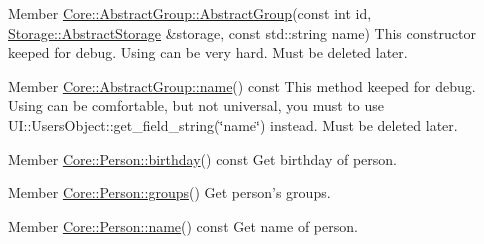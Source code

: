 \label{da/d58/deprecated__deprecated000001}
\hypertarget{da/d58/deprecated__deprecated000001}{}
 
\begin{DoxyDescription}
\item[Member \hyperlink{classCore_1_1AbstractGroup_a2b6c9e7b2d618019fe626d28a53ddd06}{Core::AbstractGroup::AbstractGroup}(const int id, \hyperlink{classStorage_1_1AbstractStorage}{Storage::AbstractStorage} \&storage, const std::string name) ]This constructor keeped for debug. Using can be very hard. Must be deleted later.
\end{DoxyDescription}

\label{da/d58/deprecated__deprecated000002}
\hypertarget{da/d58/deprecated__deprecated000002}{}
 
\begin{DoxyDescription}
\item[Member \hyperlink{classCore_1_1AbstractGroup_a139cc0a6451f2dbca1f74d96f28741f0}{Core::AbstractGroup::name}() const  ]This method keeped for debug. Using can be comfortable, but not universal, you must to use UI::UsersObject::get\_\-field\_\-string(\char`\"{}name\char`\"{}) instead. Must be deleted later.
\end{DoxyDescription}

\label{da/d58/deprecated__deprecated000007}
\hypertarget{da/d58/deprecated__deprecated000007}{}
 
\begin{DoxyDescription}
\item[Member \hyperlink{classCore_1_1Person_ab0d1836a97254798585fc6c97a63680e}{Core::Person::birthday}() const  ]Get birthday of person. 
\end{DoxyDescription}

\label{da/d58/deprecated__deprecated000008}
\hypertarget{da/d58/deprecated__deprecated000008}{}
 
\begin{DoxyDescription}
\item[Member \hyperlink{classCore_1_1Person_ae6dc9f0c0ca2caf326b69b72d81aea84}{Core::Person::groups}() ]Get person's groups. 
\end{DoxyDescription}

\label{da/d58/deprecated__deprecated000004}
\hypertarget{da/d58/deprecated__deprecated000004}{}
 
\begin{DoxyDescription}
\item[Member \hyperlink{classCore_1_1Person_a14d39111fb34383818154a26b0d248f5}{Core::Person::name}() const  ]Get name of person. 
\end{DoxyDescription}

